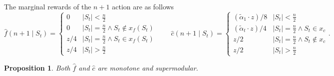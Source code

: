 \documentclass[11pt]{article}
\newtheorem{proposition}{Proposition}
\newcommand{\talpha}{\tilde{\alpha}}
\newcommand{\hf}{\hat{f}}
\newcommand{\hc}{\hat{c}}
\begin{document}
The marginal rewards of the $n+1$ action are as follows
$$
\hf(n+1 \mid S_t) = 
\begin{cases}
    0 & |S_t| < \frac{n}{2} \\
    0 & |S_t| = \frac{n}{2} \land S_t \notin x_f(S_t) \\
    z/4 & |S_t| = \frac{n}{2} \land S_t \in x_f(S_t)\\
    z/4 & |S_t| > \frac{n}{2}
\end{cases}
\qquad 
\hc(n+1 \mid S_t) = 
\begin{cases}
    (\talpha_1\cdot z)/8 & |S_t| < \frac{n}{2} \\
    (\talpha_t\cdot z)/4 & |S_t| = \frac{n}{2} \land S_t \in x_c \\
    z/2 & |S_t| = \frac{n}{2} \land S_t \notin x_c \\
    z/2 & |S_t| > \frac{n}{2}
\end{cases}.
$$
    
\begin{proposition}\label{prop:monotone_supmod_hf_hc}
    Both $\hf$ and $\hc$ are monotone and supermodular.
\end{proposition}
\end{document}
